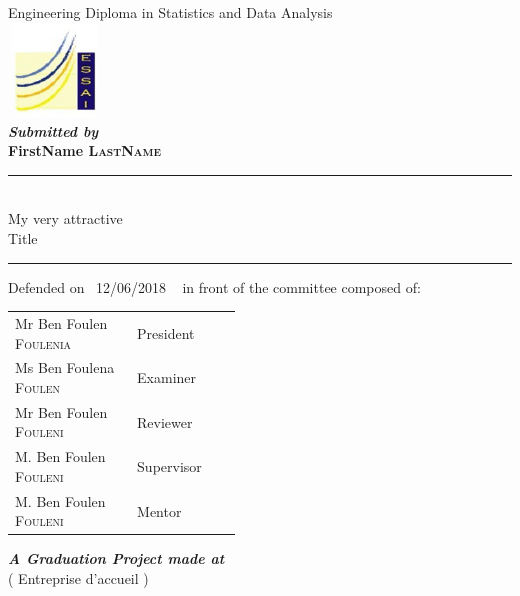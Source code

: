 \documentclass[a4paper, oneside]{report}
\newcommand{\reportAuthor} {%
  FirstName \textsc{LastName}%
}
\newcommand{\reportSubject} {%
  My very attractive \\ Title%
}
\newcommand{\dateSoutenance} {%
  12/06/2018%
}
\newcommand{\studyDepartment} {%
  Entreprise d'accueil %
}
\newcommand{\juryPresident} {%
  Mr Ben Foulen \textsc{Foulenia}%
}
\newcommand{\juryPresidentDesc} {%
  President%
}
\newcommand{\juryMemberOne} {%
  Ms Ben Foulena \textsc{Foulen}%
}
\newcommand{\juryMemberOneDesc} {%
  Examiner %
}
\newcommand{\juryMemberTwo} {%
  Mr Ben Foulen \textsc{Fouleni}%
}
\newcommand{\juryMemberTwoDesc} {%
  Reviewer%
}
\newcommand{\juryMemberThree} {%
	M. Ben Foulen \textsc{Fouleni}%
}
\newcommand{\juryMemberThreeDesc} {%
	Supervisor%
}
\newcommand{\juryMemberFour} {%
	M. Ben Foulen \textsc{Fouleni}%
}
\newcommand{\juryMemberFourDesc} {%
	Mentor%
}
\begin{document}
\begin{titlepage}
\begin{center}
\vspace{10pt}
Engineering Diploma in Statistics and Data Analysis\\

\includegraphics[width=2.5cm, height=2.5cm]{logo-essai.jpg}\\

\vspace{10pt}
\textbf{\textit{Submitted by}}\\
\vspace{10pt} {%
  \fontsize{18pt}{18pt}\selectfont%
  \textbf{\reportAuthor}\\
}%

\vspace{10pt} {%
  \renewcommand*{\familydefault}{\defaultFont}
  \fontsize{27pt}{27pt}\selectfont%
  \rule{0.5\textwidth}{.4pt}\\
  \vspace{10pt}
  \reportSubject{}\\%
  \vspace{10pt}
  \rule{0.5\textwidth}{.4pt}
}

\vspace{10pt}
Defended on~\dateSoutenance~ in front of the committee composed of:\\
\vspace{20pt}
\begin{tabular}{p{0.3\linewidth} p{0.15\linewidth}}
  \juryPresident{} & \juryPresidentDesc{}\\
  \juryMemberOne{} & \juryMemberOneDesc{}\\
  \juryMemberTwo{} & \juryMemberTwoDesc{}\\
  \juryMemberThree{} & \juryMemberThreeDesc{}\\
  \juryMemberFour{} & \juryMemberFourDesc{}\\
\end{tabular}

\vspace{10pt}%
\textbf{\textit{A Graduation Project made at}}\\

\vspace{10pt}
(\studyDepartment)\\

\end{center}
\end{titlepage}
\end{document}

